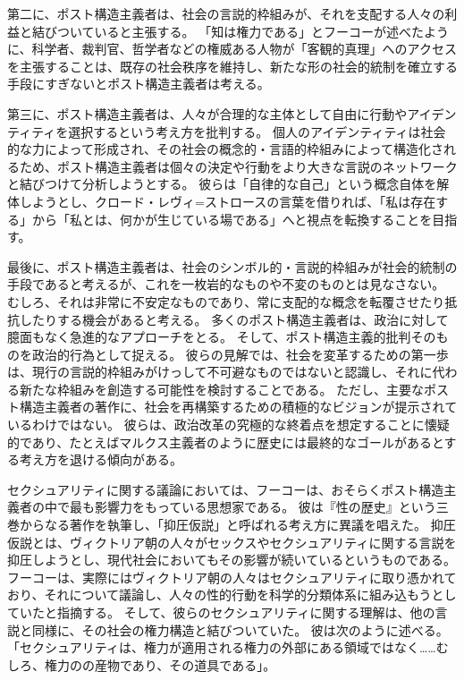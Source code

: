 \documentclass[paper=a4,book,openany]{jlreq} \usepackage{mystyle}
\begin{document}
第二に、ポスト構造主義者は、社会の言説的枠組みが、それを支配する人々の利益と結びついていると主張する。
「知は権力である」とフーコーが述べたように、科学者、裁判官、哲学者などの権威ある人物が「客観的真理」へのアクセスを主張することは、既存の社会秩序を維持し、新たな形の社会的統制を確立する手段にすぎないとポスト構造主義者は考える。

第三に、ポスト構造主義者は、人々が合理的な主体として自由に行動やアイデンティティを選択するという考え方を批判する。
個人のアイデンティティは社会的な力によって形成され、その社会の概念的・言語的枠組みによって構造化されるため、ポスト構造主義者は個々の決定や行動をより大きな言説のネットワークと結びつけて分析しようとする。
彼らは「自律的な自己」という概念自体を解体しようとし、クロード・レヴィ=ストロースの言葉を借りれば、「私は存在する」から「私とは、何かが生じている場である」へと視点を転換することを目指す。

最後に、ポスト構造主義者は、社会のシンボル的・言説的枠組みが社会的統制の手段であると考えるが、これを一枚岩的なものや不変のものとは見なさない。
むしろ、それは非常に不安定なものであり、常に支配的な概念を転覆させたり抵抗したりする機会があると考える。
多くのポスト構造主義者は、政治に対して臆面もなく急進的なアプローチをとる。
そして、ポスト構造主義的批判そのものを政治的行為として捉える。
彼らの見解では、社会を変革するための第一歩は、現行の言説的枠組みがけっして不可避なものではないと認識し、それに代わる新たな枠組みを創造する可能性を検討することである。
ただし、主要なポスト構造主義者の著作に、社会を再構築するための積極的なビジョンが提示されているわけではない。
彼らは、政治改革の究極的な終着点を想定することに懐疑的であり、たとえばマルクス主義者のように歴史には最終的なゴールがあるとする考え方を退ける傾向がある。

セクシュアリティに関する議論においては、フーコーは、おそらくポスト構造主義者の中で最も影響力をもっている思想家である。
彼は『性の歴史』という三巻からなる著作を執筆し、「抑圧仮説」と呼ばれる考え方に異議を唱えた。
抑圧仮説とは、ヴィクトリア朝の人々がセックスやセクシュアリティに関する言説を抑圧しようとし、現代社会においてもその影響が続いているというものである。
フーコーは、実際にはヴィクトリア朝の人々はセクシュアリティに取り憑かれており、それについて議論し、人々の性的行動を科学的分類体系に組み込もうとしていたと指摘する。
そして、彼らのセクシュアリティに関する理解は、他の言説と同様に、その社会の権力構造と結びついていた。
彼は次のように述べる。
「セクシュアリティは、権力が適用される権力の外部にある領域ではなく……むしろ、権力のの産物であり、その道具である」\citep[p.152]{foucault81:_histor_sexual}。
\end{document}
